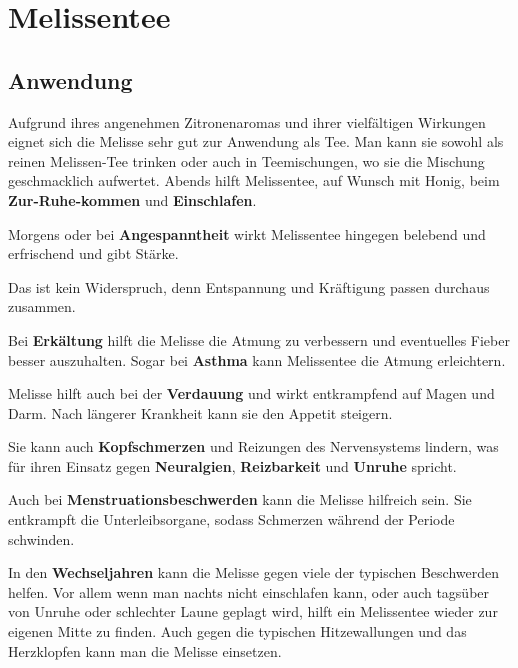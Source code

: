 \section{Melissentee}

           


\subsection{Anwendung}

Aufgrund ihres angenehmen Zitronenaromas und ihrer vielfältigen Wirkungen eignet sich die Melisse sehr gut zur Anwendung als Tee. Man kann sie sowohl als reinen Melissen-Tee trinken oder auch in Teemischungen, wo sie die Mischung geschmacklich aufwertet.
Abends hilft Melissentee, auf Wunsch mit Honig, beim \textbf{Zur-Ruhe-kommen} und \textbf{Einschlafen}.

Morgens oder bei \textbf{Angespanntheit} wirkt Melissentee hingegen belebend und erfrischend und gibt Stärke.

Das ist kein Widerspruch, denn Entspannung und Kräftigung passen durchaus zusammen.

Bei \textbf{Erkältung} hilft die Melisse die Atmung zu verbessern und eventuelles Fieber besser auszuhalten. Sogar bei \textbf{Asthma} kann Melissentee die Atmung erleichtern.

Melisse hilft auch bei der \textbf{Verdauung} und wirkt entkrampfend auf Magen und Darm. Nach längerer Krankheit kann sie den Appetit steigern.

Sie kann auch \textbf{Kopfschmerzen} und Reizungen des Nervensystems lindern, was für ihren Einsatz gegen \textbf{Neuralgien}, \textbf{Reizbarkeit} und \textbf{Unruhe} spricht.

Auch bei \textbf{Menstruationsbeschwerden} kann die Melisse hilfreich sein. Sie entkrampft die Unterleibsorgane, sodass Schmerzen während der Periode schwinden.

In den \textbf{Wechseljahren} kann die Melisse gegen viele der typischen Beschwerden helfen. Vor allem wenn man nachts nicht einschlafen kann, oder auch tagsüber von Unruhe oder schlechter Laune geplagt wird, hilft ein Melissentee wieder zur eigenen Mitte zu finden. Auch gegen die typischen Hitzewallungen und das Herzklopfen kann man die Melisse einsetzen.


